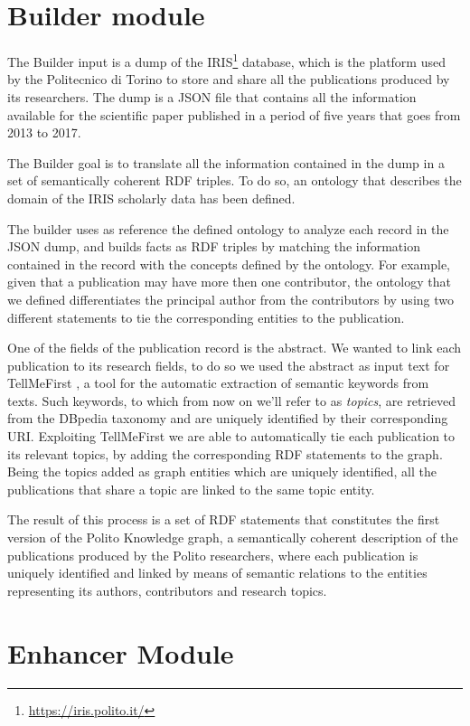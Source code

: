 \documentclass[%
    corpo=13.5pt,
    twoside,
    oldstyle,
    tipotesi=magistrale,
    greek,
    evenboxes
]{toptesi}
\begin{document}
\section{Builder module}

The Builder input is a dump of the
IRIS\footnote{\url{https://iris.polito.it/}} database, which is the platform
used by the Politecnico di Torino to store and share all the
publications produced by its researchers. The dump is a JSON file that contains
all the information available for the scientific paper published in a period
of five years that goes from 2013 to 2017.

The Builder goal is to translate all the information contained in the
dump in a set of semantically coherent RDF triples. To do so, an ontology that
describes the domain of the IRIS scholarly data has been defined.

The builder uses as reference the defined ontology to analyze each record in
the JSON dump, and builds facts as RDF triples by matching the information
contained in the record with the concepts defined by the ontology.
For example, given that a publication may have more then one contributor, the
ontology that we defined differentiates the principal author from the
contributors by using two different statements to tie the corresponding entities
to the publication.

One of the fields of the publication record is the abstract. We wanted to
link each publication to its research fields, to do so we used the abstract
as input text for TellMeFirst \cite{rocha2015}, a tool for the automatic
extraction of semantic keywords from texts. Such keywords, to which from now
on we'll refer to as \emph{topics}, are retrieved from the DBpedia taxonomy
and are uniquely identified by their corresponding URI.
Exploiting TellMeFirst we are able to automatically tie each publication to
its relevant topics, by adding the corresponding RDF statements to the graph.
Being the topics added as graph entities which are uniquely identified, all the
publications that share a topic are linked to the same topic entity.

The result of this process is a set of RDF statements that constitutes the
first version of the Polito Knowledge graph, a semantically coherent description
of the publications produced by the Polito researchers, where each
publication is uniquely identified and linked by means of semantic relations
to the entities representing its authors, contributors and research topics.


\section{Enhancer Module}
\end{document}
